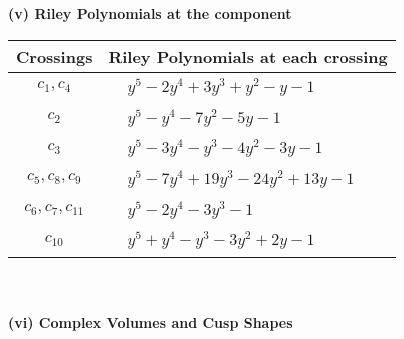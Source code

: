 \documentclass[1p]{elsarticle_modified}
\theoremstyle{definition}
\begin{document}
\newpage\renewcommand{\arraystretch}{1}
\flushleft \textbf{(v) Riley Polynomials at the component}\newline \\
\begin{tabular}{m{50pt}|m{274pt}}
Crossings & \hspace{64pt}Riley Polynomials at each crossing \\
\hline $$\begin{aligned}c_{1},c_{4}\end{aligned}$$&$\begin{aligned}
&y^5-2 y^4+3 y^3+y^2- y-1
\end{aligned}$\\
\hline $$\begin{aligned}c_{2}\end{aligned}$$&$\begin{aligned}
&y^5- y^4-7 y^2-5 y-1
\end{aligned}$\\
\hline $$\begin{aligned}c_{3}\end{aligned}$$&$\begin{aligned}
&y^5-3 y^4- y^3-4 y^2-3 y-1
\end{aligned}$\\
\hline $$\begin{aligned}c_{5},c_{8},c_{9}\end{aligned}$$&$\begin{aligned}
&y^5-7 y^4+19 y^3-24 y^2+13 y-1
\end{aligned}$\\
\hline $$\begin{aligned}c_{6},c_{7},c_{11}\end{aligned}$$&$\begin{aligned}
&y^5-2 y^4-3 y^3-1
\end{aligned}$\\
\hline $$\begin{aligned}c_{10}\end{aligned}$$&$\begin{aligned}
&y^5+y^4- y^3-3 y^2+2 y-1
\end{aligned}$\\
\hline
\end{tabular}\\~\\
\newpage\flushleft \textbf{(vi) Complex Volumes and Cusp Shapes}
\end{document}
